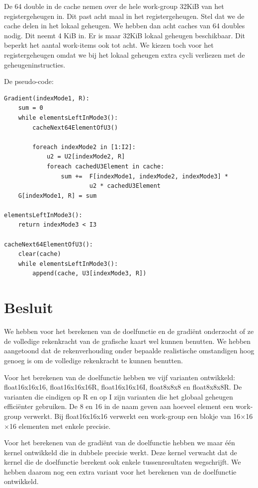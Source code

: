 De 64 double in de cache nemen over de hele work-group 32KiB van het registergeheugen in. Dit past acht maal in het registergeheugen. Stel dat we de cache delen in het lokaal geheugen. We hebben dan acht caches van 64 doubles nodig. Dit neemt 4 KiB in. Er is maar 32KiB lokaal geheugen beschikbaar. Dit beperkt het aantal work-items ook tot acht. We kiezen toch voor het registergeheugen omdat we bij het lokaal geheugen extra cycli verliezen met de geheugeninstructies.

De pseudo-code:

\begin{lstlisting}
Gradient(indexMode1, R):
	sum = 0
	while elementsLeftInMode3():
		cacheNext64ElementOfU3()
		
		foreach indexMode2 in [1:I2]:
			u2 = U2[indexMode2, R]
			foreach cachedU3Element in cache:
				sum += 	F[indexMode1, indexMode2, indexMode3] *
						u2 * cachedU3Element
	G[indexMode1, R] = sum

elementsLeftInMode3():
	return indexMode3 < I3

cacheNext64ElementOfU3():
	clear(cache)
	while elementsLeftInMode3():
		append(cache, U3[indexMode3, R])
\end{lstlisting}

\section{Besluit}
We hebben voor het berekenen van de doelfunctie en de gradi\"ent onderzocht of ze de volledige rekenkracht van de grafische kaart wel kunnen benutten. We hebben aangetoond dat de rekenverhouding onder bepaalde realistische omstandigen hoog genoeg is om de volledige rekenkracht te kunnen benutten.

Voor het berekenen van de doelfunctie hebben we vijf varianten ontwikkeld: float16x16x16, float16x16x16R, float16x16x16I, float8x8x8 en float8x8x8R. De varianten die eindigen op R en op I zijn varianten die het globaal geheugen effici\"enter gebruiken. De 8 en 16 in de naam geven aan hoeveel element een work-group verwerkt. Bij float16x16x16 verwerkt een work-group een blokje van 16$\times$16$\times$16 elementen met enkele precisie.

Voor het berekenen van de gradi\"ent van de doelfunctie hebben we maar \'e\'en kernel ontwikkeld die in dubbele precisie werkt. Deze kernel verwacht dat de kernel die de doelfunctie berekent ook enkele tussenresultaten wegschrijft. We hebben daarom nog een extra variant voor het berekenen van de doelfunctie ontwikkeld.